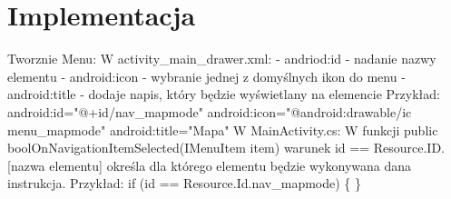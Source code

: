 	\newpage
\section{Implementacja}		%
Tworznie Menu: \newline
W activity\_main\_drawer.xml:
\newline
- andriod:id - nadanie nazwy elementu
\newline
- android:icon - wybranie jednej z domyślnych ikon do menu
\newline
- android:title - dodaje napis, który będzie wyświetlany na elemencie
\newline
Przykład:
\newline  
android:id="@+id/nav\_mapmode" \newline
android:icon="@android:drawable/ic menu\_mapmode" \newline
android:title="Mapa" \newline
W MainActivity.cs:
\newline
W funkcji public boolOnNavigationItemSelected(IMenuItem item) warunek id == Resource.ID.[nazwa elementu] określa dla którego elementu będzie wykonywana dana instrukcja. \newline
Przykład: \newline
if (id == Resource.Id.nav\_mapmode) \newline
\{ \newline
  \newline
\}
 


